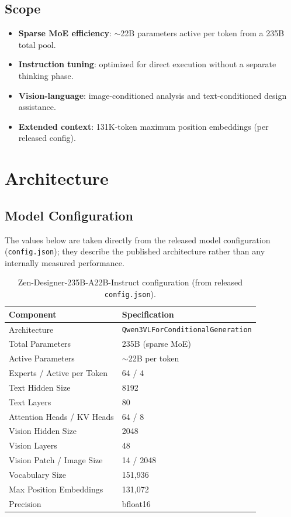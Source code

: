 \documentclass[11pt,a4paper]{article}
\begin{document}
\subsection{Scope}
\begin{itemize}
    \item \textbf{Sparse MoE efficiency}: $\sim$22B parameters active per token from a 235B total pool.
    \item \textbf{Instruction tuning}: optimized for direct execution without a separate thinking phase.
    \item \textbf{Vision-language}: image-conditioned analysis and text-conditioned design assistance.
    \item \textbf{Extended context}: 131K-token maximum position embeddings (per released config).
\end{itemize}

\section{Architecture}

\subsection{Model Configuration}

The values below are taken directly from the released model configuration
(\texttt{config.json}); they describe the published architecture rather than any
internally measured performance.

\begin{table}[H]
\centering
\begin{tabular}{ll}
\toprule
\textbf{Component} & \textbf{Specification} \\
\midrule
Architecture & \texttt{Qwen3VLForConditionalGeneration} \\
Total Parameters & 235B (sparse MoE) \\
Active Parameters & $\sim$22B per token \\
Experts / Active per Token & 64 / 4 \\
Text Hidden Size & 8192 \\
Text Layers & 80 \\
Attention Heads / KV Heads & 64 / 8 \\
Vision Hidden Size & 2048 \\
Vision Layers & 48 \\
Vision Patch / Image Size & 14 / 2048 \\
Vocabulary Size & 151{,}936 \\
Max Position Embeddings & 131{,}072 \\
Precision & bfloat16 \\
\bottomrule
\end{tabular}
\caption{Zen-Designer-235B-A22B-Instruct configuration (from released \texttt{config.json}).}
\end{table}
\end{document}
